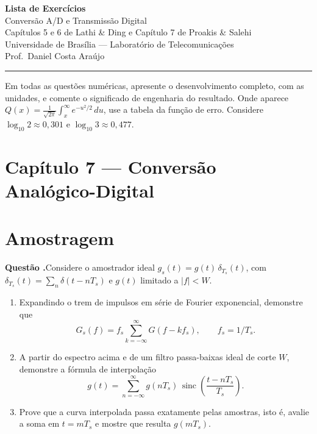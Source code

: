 \documentclass[11pt,a4paper]{article}
\newcommand{\sinc}{\operatorname{sinc}}
\newcounter{quest}
\newcommand{\Q}{\par\medskip\noindent\refstepcounter{quest}\textbf{Questão \thequest.}\enspace}
\begin{document}
\begin{center}
  {\LARGE\bfseries\color{unbprimary} Lista de Exercícios }\\[4pt]
  {\large Conversão A/D e Transmissão Digital}\\[2pt]
  {\normalsize Capítulos 5 e 6 de Lathi \& Ding e Capítulo 7 de Proakis \& Salehi}\\[6pt]
  {\small Universidade de Brasília --- Laboratório de Telecomunicações}\\
  {\small Prof.\ Daniel Costa Araújo}
\end{center}

\vspace{0.3cm}
\noindent\rule{\textwidth}{0.6pt}

\small
Em todas as questões numéricas, apresente o desenvolvimento completo, com as
unidades, e comente o significado de engenharia do resultado. Onde aparece
$Q(x)=\frac{1}{\sqrt{2\pi}}\int_x^{\infty}e^{-u^2/2}\,du$, use a tabela da função
de erro. Considere $\log_{10}2\approx 0{,}301$ e $\log_{10}3\approx 0{,}477$.
\normalsize

\vspace{0.2cm}

\section*{Capítulo 7 --- Conversão Analógico-Digital}

\section{Amostragem}

\Q Considere o amostrador ideal $g_s(t)=g(t)\,\delta_{T_s}(t)$, com
$\delta_{T_s}(t)=\sum_{n}\delta(t-nT_s)$ e $g(t)$ limitado a $|f|<W$.
\begin{enumerate}[label=(\alph*)]
  \item Expandindo o trem de impulsos em série de Fourier exponencial,
        demonstre que
        \[
          G_s(f)=f_s\sum_{k=-\infty}^{\infty}G(f-kf_s),\qquad f_s=1/T_s .
        \]
  \item A partir do espectro acima e de um filtro passa-baixas ideal de corte
        $W$, demonstre a fórmula de interpolação
        \[
          g(t)=\sum_{n=-\infty}^{\infty} g(nT_s)\,
                \sinc\!\left(\frac{t-nT_s}{T_s}\right).
        \]
  \item Prove que a curva interpolada passa exatamente pelas amostras, isto é,
        avalie a soma em $t=mT_s$ e mostre que resulta $g(mT_s)$.
\end{enumerate}
\end{document}
